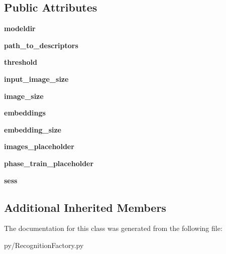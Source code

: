 \subsection*{Public Attributes}
\begin{DoxyCompactItemize}
\item 
{\bfseries modeldir}\hypertarget{classRecognitionFactory_1_1DeepFace_ae9f0b4fa62b5bee40f5284903ae28a79}{}\label{classRecognitionFactory_1_1DeepFace_ae9f0b4fa62b5bee40f5284903ae28a79}

\item 
{\bfseries path\+\_\+to\+\_\+descriptors}\hypertarget{classRecognitionFactory_1_1DeepFace_a1812f707f37da24b92c5b465e9bd72a1}{}\label{classRecognitionFactory_1_1DeepFace_a1812f707f37da24b92c5b465e9bd72a1}

\item 
{\bfseries threshold}\hypertarget{classRecognitionFactory_1_1DeepFace_a99e7d114754ce266408a604327a4e53d}{}\label{classRecognitionFactory_1_1DeepFace_a99e7d114754ce266408a604327a4e53d}

\item 
{\bfseries input\+\_\+image\+\_\+size}\hypertarget{classRecognitionFactory_1_1DeepFace_a094d9b877ae4c19b6a99a6e9c4e3f7df}{}\label{classRecognitionFactory_1_1DeepFace_a094d9b877ae4c19b6a99a6e9c4e3f7df}

\item 
{\bfseries image\+\_\+size}\hypertarget{classRecognitionFactory_1_1DeepFace_afe10131552817f6992ee1da1aca68137}{}\label{classRecognitionFactory_1_1DeepFace_afe10131552817f6992ee1da1aca68137}

\item 
{\bfseries embeddings}\hypertarget{classRecognitionFactory_1_1DeepFace_ad819d9e630129c069b48a9d1108965ca}{}\label{classRecognitionFactory_1_1DeepFace_ad819d9e630129c069b48a9d1108965ca}

\item 
{\bfseries embedding\+\_\+size}\hypertarget{classRecognitionFactory_1_1DeepFace_a936b040d27a005f9a4b8c8e6cfdd5728}{}\label{classRecognitionFactory_1_1DeepFace_a936b040d27a005f9a4b8c8e6cfdd5728}

\item 
{\bfseries images\+\_\+placeholder}\hypertarget{classRecognitionFactory_1_1DeepFace_a43b63b6f56696dd6ac3675ae05f188a4}{}\label{classRecognitionFactory_1_1DeepFace_a43b63b6f56696dd6ac3675ae05f188a4}

\item 
{\bfseries phase\+\_\+train\+\_\+placeholder}\hypertarget{classRecognitionFactory_1_1DeepFace_a283dd13e64bd2970c32ae05a5caeaa44}{}\label{classRecognitionFactory_1_1DeepFace_a283dd13e64bd2970c32ae05a5caeaa44}

\item 
{\bfseries sess}\hypertarget{classRecognitionFactory_1_1DeepFace_ab712a582e7b4198179818ac3f271dc7c}{}\label{classRecognitionFactory_1_1DeepFace_ab712a582e7b4198179818ac3f271dc7c}

\end{DoxyCompactItemize}
\subsection*{Additional Inherited Members}


The documentation for this class was generated from the following file\+:\begin{DoxyCompactItemize}
\item 
py/Recognition\+Factory.\+py\end{DoxyCompactItemize}
